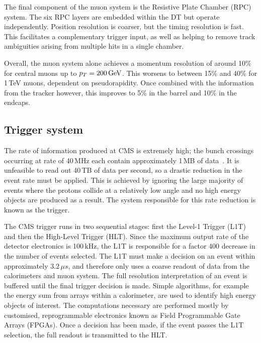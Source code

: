 The final component of the muon system is the Resistive Plate Chamber (RPC) system.
The six RPC layers are embedded within the DT but operate independently.
Position resolution is coarser, but the timing resolution is fast.
This facilitates a complementary trigger input, as well as helping to remove track ambiguities arising from multiple hits in a single chamber. %

Overall, the muon system alone achieves a momentum resolution of around 10\% for central muons up to $p_T=200\,\textrm{GeV}$.
This worsens to between 15\% and 40\% for 1\,TeV muons, dependent on pseudorapidity.
Once combined with the information from the tracker however, this improves to 5\% in the barrel and 10\% in the endcaps.

\subsection{Trigger system}

The rate of information produced at CMS is extremely high; 
the bunch crossings occurring at rate of 40\,MHz each contain approximately 1\,MB of data~\cite{CMStrigger}.
It is unfeasible to read out 40\,TB of data per second, so a drastic reduction in the event rate must be applied.
This is achieved by ignoring the large majority of events where the protons collide at a relatively low angle and no high energy objects are produced as a result.
The system responsible for this rate reduction is known as the trigger.

The CMS trigger runs in two sequential stages: first the Level-1 Trigger (L1T) and then the High-Level Trigger (HLT).
Since the maximum output rate of the detector electronics is 100\,kHz, the L1T is responsible for a factor 400 decrease in the number of events selected.
The L1T must make a decision on an event within approximately $3.2\,\mu s$, and therefore only uses a coarse readout of data from the calorimeters and muon system.
The full resolution interpretation of an event is buffered until the final trigger decision is made. %
Simple algorithms, for example the energy sum from arrays within a calorimeter, are used to identify high energy objects of interest.
The computations necessary are performed mostly by customised, reprogrammable electronics known as Field Programmable Gate Arrays (FPGAs).
Once a decision has been made, if the event passes the L1T selection, the full readout is transmitted to the HLT.

